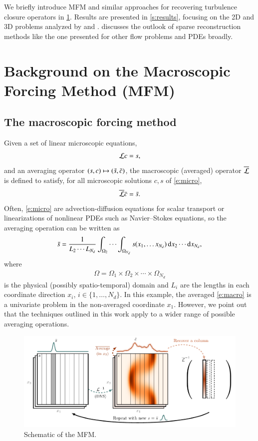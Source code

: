\documentclass[11pt,sort&compress]{elsarticle}
\begin{document}
We briefly introduce MFM and similar approaches for recovering turbulence closure operators in \cref{s:mfm}.
Results are presented in \cref{s:results}, focusing on the 2D and 3D problems analyzed by \citet{maniMacroscopicForcingMethod2021} and \citet{park21}.
 discusses the outlook of sparse reconstruction methods like the one presented for other flow problems and PDEs broadly.

\section{Background on the Macroscopic Forcing Method (MFM)}\label{s:mfm}

\subsection{The macroscopic forcing method}

Given a set of linear microscopic equations,
\begin{gather}
    \mathcal{L} c = s,
    \label{e:micro}
\end{gather}
and an averaging operator $(s, c) \mapsto (\bar{s}, \bar{c})$, the macroscopic (averaged) operator $\overline{\mathcal{L}}$ is defined to satisfy, for all microscopic solutions $c, s$ of \cref{e:micro}, 
\begin{gather}
    \overline{\mathcal{L}} \bar{c} = \bar{s}.
    \label{e:macro}
\end{gather}
Often, \cref{e:micro} are advection-diffusion equations for scalar transport or linearizations of nonlinear PDEs such as Navier--Stokes equations, so the averaging operation can be written as 
\begin{gather}
    \bar{s} = \frac{1}{L_2 \cdots L_{N_d}}\int_{\Omega_{2}} \cdots \int_{\Omega_{N_d}} s(x_1, \ldots x_{N_d}) \, \text{d} x_2 \cdots \text{d} x_{N_d},
\end{gather}
where 
\begin{gather}
    \Omega = \Omega_{1} \times \Omega_{2} \times \cdots \times \Omega_{N_d}
\end{gather}
is the physical (possibly spatio-temporal) domain and $L_i$ are the lengths in each coordinate direction $x_i$, $i \in \{1,\dots,N_d\}$.
In this example, the averaged \cref{e:macro} is a univariate problem in the non-averaged coordinate $x_1$. 
However, we point out that the techniques outlined in this work apply to a wider range of possible averaging operations.

\begin{figure}[H]
    \centering
    \includegraphics[scale=1]{figures/overview.pdf}
    \caption{
        Schematic of the MFM. 
    }
    \label{f:overview}
\end{figure}
\end{document}
